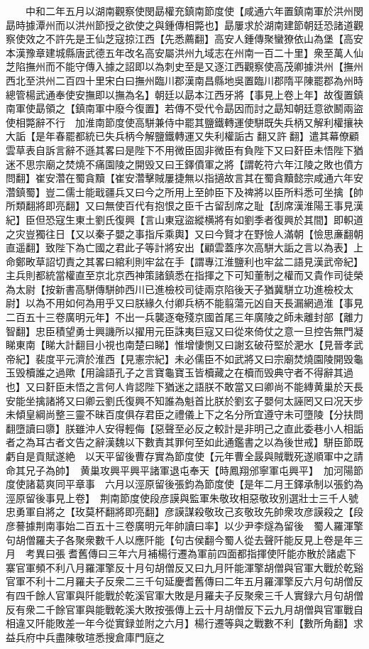 　　中和二年五月以湖南觀察使閔勗權充鎮南節度使【咸通六年置鎮南軍於洪州閔勗時據潭州而以洪州節授之欲使之與鍾傳相斃也】勗屢求於湖南建節朝廷恐諸道觀察使效之不許先是王仙芝寇掠江西【先悉薦翻】高安人鍾傳聚蠻獠依山為堡【高安本漢豫章建城縣唐武德五年改名高安屬洪州九域志在州南一百二十里】衆至萬人仙芝陷撫州而不能守傳入據之詔即以為刺史至是又逐江西觀察使高茂卿據洪州【撫州西北至洪州二百四十里宋白曰撫州臨川郡漢南昌縣地吳置臨川郡隋平陳罷郡為州時總管楊武通奉使安撫即以撫為名】朝廷以勗本江西牙將【事見上卷上年】故復置鎮南軍使勗領之【鎮南軍中廢今復置】若傳不受代令勗因而討之勗知朝廷意欲鬭兩盜使相斃辭不行　加淮南節度使高駢兼侍中罷其鹽鐵轉運使駢既失兵柄又解利權攘袂大詬【是年春罷都統已失兵柄今解鹽鐵轉運又失利權詬古翻又許翻】遣其幕僚顧雲草表自訴言辭不遜其畧曰是陛下不用微臣固非微臣有負陛下又曰姧臣未悟陛下猶迷不思宗廟之焚燒不痛園陵之開毁又曰王鐸僨軍之將【謂乾符六年江陵之敗也僨方問翻】崔安濳在蜀貪黷【崔安濳擊賊屢捷無以指擿故言其在蜀貪黷懿宗咸通六年安濳鎮蜀】豈二儒士能戢疆兵又曰今之所用上至帥臣下及禆將以臣所料悉可坐擒【帥所類翻將即亮翻】又曰無使百代有抱恨之臣千古留刮席之耻【刮席漢淮陽王事見漢紀】臣但恐寇生東土劉氏復興【言山東寇盜縱横將有如劉季者復興於其間】即軹道之灾豈獨往日【又以秦子嬰之事指斥乘輿】又曰今賢才在野憸人滿朝【憸思亷翻朝直遥翻】致陛下為亡國之君此子等計將安出【顧雲蓋序次高駢大詬之言以為表】上命鄭畋草詔切責之其畧曰綰利則牢盆在手【謂專江淮鹽利也牢盆二語見漢武帝紀】主兵則都統當權直至京北京西神策諸鎮悉在指揮之下可知董制之權而又貴作司徒榮為太尉【按新書高駢傳駢帥西川已進檢校司徒兩京陷後天子猶冀駢立功進檢校太尉】以為不用如何為用乎又曰朕緣久付卿兵柄不能翦蕩元凶自天長漏網過淮【事見二百五十三卷廣明元年】不出一兵襲逐奄殘京國首尾三年廣陵之師未離封部【離力智翻】忠臣積望勇士興譏所以擢用元臣誅夷巨寇又曰從來倚仗之意一旦控告無門凝睇東南【睇大計翻目小視也南楚曰睇】惟增悽惻又曰謝玄破苻堅於淝水【見晉孝武帝紀】裴度平元濟於淮西【見憲宗紀】未必儒臣不如武將又曰宗廟焚燒園陵開毁龜玉毁櫝誰之過歟【用論語孔子之言寶龜寶玉皆櫝藏之在櫝而毁典守者不得辭其過也】又曰姧臣未悟之言何人肯認陛下猶迷之語朕不敢當又曰卿尚不能縳黄巢於天長安能坐擒諸將又曰卿云劉氏復興不知誰為魁首比朕於劉玄子嬰何太誣罔又曰况天步未傾皇綱尚整三靈不昧百度俱存君臣之禮儀上下之名分所宜遵守未可墮陵【分扶問翻墮讀曰隳】朕雖沖人安得輕侮【惡聲至必反之較計是非明己之直此委巷小人相詬者之為耳古者文告之辭漢魏以下數責其罪何至如此通鑑書之以為後世戒】駢臣節既虧自是貢賦遂絶　以天平留後曹存實為節度使【元年曹全晸與賊戰死遂順軍中之請命其兄子為帥】　黄巢攻興平興平諸軍退屯奉天【時鳳翔邠寧軍屯興平】　加河陽節度使諸葛爽同平章事　六月以涇原留後張鈞為節度使【是年二月王鐸承制以張釣為涇原留後事見上卷】　荆南節度使段彦謨與監軍朱敬玫相惡敬玫别選壯士三千人號忠勇軍自將之【玫莫杯翻將即亮翻】彦謨謀殺敬玫己亥敬玫先帥衆攻彦謨殺之【段彦謩據荆南事始二百五十三卷廣明元年帥讀曰率】以少尹李燧為留後　蜀人羅渾擎句胡僧羅夫子各聚衆數千人以應阡能【句古侯翻今蜀人從去聲阡能反見上卷是年三月　考異曰張耆舊傳曰三年六月補楊行遷為軍前四面都指揮使阡能亦散於諸處下寨官軍頻不利八月羅渾擎反十月句胡僧反又曰九月阡能渾擎胡僧與官軍大戰於乾谿官軍不利十二月羅夫子反衆二三千句延慶耆舊傳曰二年五月羅渾擎反六月句胡僧反有四千餘人官軍與阡能戰於乾溪官軍大敗是月羅夫子反聚衆三千人實録六月句胡僧反有衆二千餘官軍與能戰乾溪大敗按張傳上云十月胡僧反下云九月胡僧與官軍戰自相違又阡能敗差一年今從實録並附之六月】楊行遷等與之戰數不利【數所角翻】求益兵府中兵盡陳敬瑄悉搜倉庫門庭之